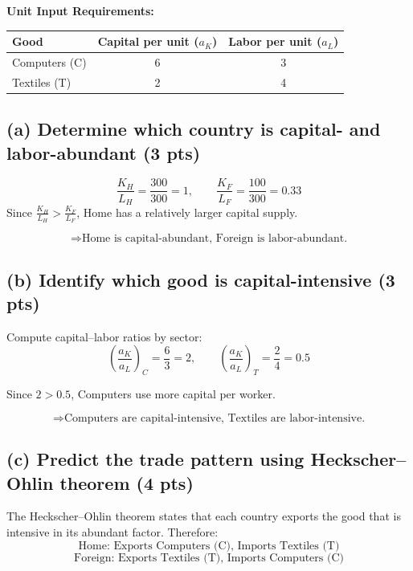 \documentclass[12pt]{article}
\begin{document}
\noindent \textbf{Unit Input Requirements:}

\begin{center}
\begin{tabular}{lcc}
\toprule
\textbf{Good} & \textbf{Capital per unit ($a_K$)} & \textbf{Labor per unit ($a_L$)} \\
\midrule
Computers (C) & 6 & 3 \\
Textiles (T) & 2 & 4 \\
\bottomrule
\end{tabular}
\end{center}

\vspace{0.5cm}

\subsection*{(a) Determine which country is capital- and labor-abundant (3 pts)}

\[
\frac{K_H}{L_H} = \frac{300}{300} = 1, \qquad 
\frac{K_F}{L_F} = \frac{100}{300} = 0.33
\]
Since $\frac{K_H}{L_H} > \frac{K_F}{L_F}$, Home has a relatively larger capital supply. 

\[
\Rightarrow \text{Home is capital-abundant, Foreign is labor-abundant.}
\]

\vspace{0.4cm}

\subsection*{(b) Identify which good is capital-intensive (3 pts)}

Compute capital--labor ratios by sector:
\[
\left( \frac{a_K}{a_L} \right)_C = \frac{6}{3} = 2, \qquad
\left( \frac{a_K}{a_L} \right)_T = \frac{2}{4} = 0.5
\]

Since $2 > 0.5$, Computers use more capital per worker.

\[
\Rightarrow \text{Computers are capital-intensive, Textiles are labor-intensive.}
\]

\vspace{0.4cm}

\subsection*{(c) Predict the trade pattern using Heckscher--Ohlin theorem (4 pts)}

\noindent The Heckscher--Ohlin theorem states that each country exports the good that is intensive in its abundant factor. Therefore:
\[
\text{Home: Exports Computers (C), Imports Textiles (T)}
\]
\[
\text{Foreign: Exports Textiles (T), Imports Computers (C)}
\]
\end{document}
